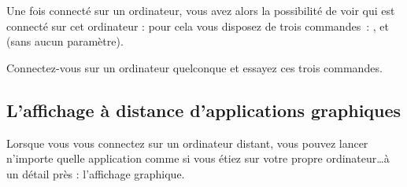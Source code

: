 \documentclass[11pt,a4paper]{article}
\begin{document}
Une fois connecté sur un ordinateur, vous avez alors la
possibilité de voir qui est connecté sur cet ordinateur : pour
cela vous disposez de trois commandes~: ,  et
 (sans aucun paramètre).

\begin{maw}
 Connectez-vous sur un ordinateur quelconque et essayez ces trois
 commandes.
\end{maw}

% 

% 
% 
% 
% 


\subsection{L'affichage à distance d'applications graphiques}

Lorsque vous vous connectez sur un ordinateur distant, vous pouvez
lancer n'importe quelle application comme si vous étiez sur
votre propre ordinateur\ldots à un détail près : l'affichage
graphique.
\end{document}
